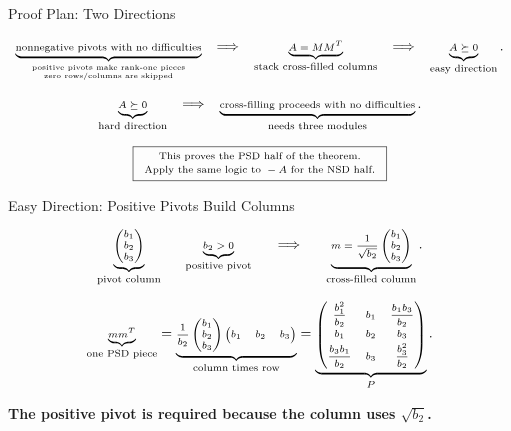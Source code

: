 \documentclass[10pt]{beamer}
\theoremstyle{definition}
\newcommand{\x}[1]{\alert{\textbf{#1}}}
\begin{document}
\begin{frame}[shrink=8]{Proof Plan: Two Directions}

\[
\scriptsize
\underbrace{\text{nonnegative pivots with no difficulties}}_{\substack{\text{positive pivots make rank-one pieces}\\\text{zero rows/columns are skipped}}}
\quad\Longrightarrow\quad
\underbrace{A=MM^T}_{\text{stack cross-filled columns}}
\quad\Longrightarrow\quad
\underbrace{A\succeq0}_{\text{easy direction}}.
\]

\vfill

\[
\scriptsize
\underbrace{A\succeq0}_{\text{hard direction}}
\quad\Longrightarrow\quad
\underbrace{\text{cross-filling proceeds with no difficulties}}_{\text{needs three modules}}.
\]

\vfill

\[
\scriptsize
\boxed{
\begin{array}{c}
\text{This proves the PSD half of the theorem.}\\[0.2em]
\text{Apply the same logic to }-A\text{ for the NSD half.}
\end{array}}
\]

\end{frame}


\begin{frame}[shrink=8]{Easy Direction: Positive Pivots Build Columns}

\[
\scriptsize
\underbrace{
\begin{pmatrix}
b_1\\ b_2\\ b_3
\end{pmatrix}}_{\text{pivot column}}
\qquad
\underbrace{b_2>0}_{\text{positive pivot}}
\qquad
\Longrightarrow
\qquad
\underbrace{m=\frac1{\sqrt{b_2}}
\begin{pmatrix}
b_1\\ b_2\\ b_3
\end{pmatrix}}_{\text{cross-filled column}}.
\]

\vfill

\[
\scriptsize
\underbrace{mm^T}_{\text{one PSD piece}}
=
\underbrace{\frac1{b_2}
\begin{pmatrix}b_1\\ b_2\\ b_3\end{pmatrix}
\begin{pmatrix}b_1&b_2&b_3\end{pmatrix}}_{\text{column times row}}
=
\underbrace{
\begin{pmatrix}
\dfrac{b_1^2}{b_2}&b_1&\dfrac{b_1b_3}{b_2}\\[0.7em]
b_1&b_2&b_3\\[0.3em]
\dfrac{b_3b_1}{b_2}&b_3&\dfrac{b_3^2}{b_2}
\end{pmatrix}}_{P}.
\]

\vfill

\begin{center}
\x{The positive pivot is required because the column uses $\sqrt{b_2}$.}
\end{center}

\end{frame}
\end{document}
